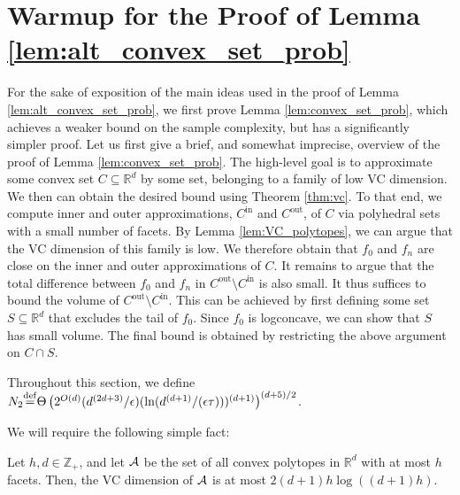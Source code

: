 \documentclass[final,12pt]{colt2018}
\newtheorem{informal theorem}[theorem]{Theorem (informal statement)}
\newcommand{\eqdef}{\stackrel{{\mathrm {\footnotesize def}}}{=}}
\newcommand{\Z}{\mathbb{Z}}
\newcommand{\eps}{\epsilon}
\newcommand{\cin}{C^\mathrm{in}}
\newcommand{\cout}{C^\mathrm{out}}
\begin{document}
\section{Warmup for the Proof of Lemma \ref{lem:alt_convex_set_prob}}\label{sec:warmup}

For the sake of exposition of the main ideas used in the proof of Lemma \ref{lem:alt_convex_set_prob}, 
we first prove Lemma \ref{lem:convex_set_prob}, which achieves a weaker bound on the sample complexity, but has a significantly simpler proof.
Let us first give a brief, and somewhat imprecise, overview of the proof of Lemma \ref{lem:convex_set_prob}.
The high-level goal is to approximate some convex set $C\subseteq \mathbb{R}^d$ by some set, belonging to a family of low VC dimension.
We then can obtain the desired bound using Theorem \ref{thm:vc}.
To that end, we compute inner and outer approximations, $\cin$ and $\cout$, of $C$ via polyhedral sets with a small number of facets.
By Lemma \ref{lem:VC_polytopes}, we can argue that the VC dimension of this family is low.
We therefore obtain that $f_0$ and $f_n$ are close on the inner and outer approximations of $C$.
It remains to argue that the total difference between $f_0$ and $f_n$ in $\cout\setminus \cin$ is also small.
It thus suffices to bound the volume of $\cout\setminus \cin$.
This can be achieved by first defining some set $S\subseteq \mathbb{R}^d$ that excludes the tail of $f_0$.
Since $f_0$ is logconcave, we can show that $S$ has small volume.
The final bound is obtained by restricting the above argument on $C\cap S$.


Throughout this section, we define $N_2  {\eqdef} \Theta\left( 2^{O(d)}(d^{(2d+3)}/\eps) (\ln(d^{(d+1)}/(\eps\tau)) )^{(d+1)} \right)^{(d+5)/2}$.

We will require the following simple fact:

\begin{lemma}\label{lem:VC_polytopes}
Let $h,d\in  {\Z_+}$, and let ${\cal A}$ be the set of all convex 
polytopes in $\mathbb{R}^d$ with at most $h$ facets.
Then, the VC dimension of ${\cal A}$ is at most $2(d+1) h \log((d+1)h)$.
\end{lemma}
\end{document}
